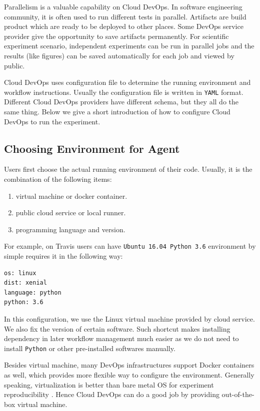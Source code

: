 \documentclass{IEEEcsmag}
\begin{document}
Parallelism is a valuable capability on Cloud DevOps. In software engineering community, it is often used to run different tests in parallel.
Artifacts are build product which are ready to be deployed to other places.
Some DevOps service provider give the opportunity to save artifacts permanently. For scientific experiment scenario, independent experiments can be run in parallel jobs and the results (like figures) can be saved automatically for each job and viewed by public.

Cloud DevOps uses configuration file to determine the running environment and workflow instructions. 
Usually the configuration file is written in \texttt{YAML} format. Different Cloud DevOps providers have different schema, but they all do the same thing. Below we give a short introduction of how to configure Cloud DevOps to run the experiment.
\subsection{Choosing Environment for Agent}
Users first choose the actual running environment of their code. Usually, it is the combination of the following items:
\begin{enumerate}
\item virtual machine or docker container.
\item public cloud service or local runner.
\item programming language and version.
\end{enumerate}

For example, on Travis users can have  \texttt{Ubuntu 16.04 Python 3.6} environment by simple requires it in the following way:
\begin{lstlisting}[caption={environment configuration}]
os: linux
dist: xenial
language: python
python: 3.6
\end{lstlisting}

In this configuration, we use the Linux virtual machine provided by cloud service. We also fix the version of certain software. 
Such shortcut makes installing dependency in later workflow management much easier as we do not need to install \texttt{Python} or other pre-installed softwares manually.

Besides virtual machine, many DevOps infrastructures support Docker containers as well, which provides more flexible way to configure the environment. Generally speaking, virtualization is better than bare metal OS for experiment reproducibility \cite{Howe12}. Hence Cloud DevOps can do a good job by providing out-of-the-box virtual machine.
\end{document}
